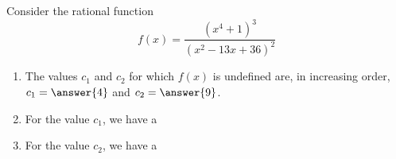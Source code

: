 \documentclass{ximera}
\author{Ivo Terek}
\begin{document}
\begin{exercise}


  Consider the rational function $$    f(x) = \frac{(x^4+1)^3}{(x^2-13x+36)^2}  $$

  \begin{enumerate}
  \item The values $c_1$ and $c_2$ for which $f(x)$ is undefined are, in increasing order, $c_1 = \answer{4}$ and $c_2 = \answer{9}$.
  \item For the value $c_1$, we have a
    \begin{multipleChoice}
    \end{multipleChoice}
  \item For the value $c_2$, we have a
    \begin{multipleChoice}
    \end{multipleChoice}
  \end{enumerate}

\end{exercise}
\end{document}
